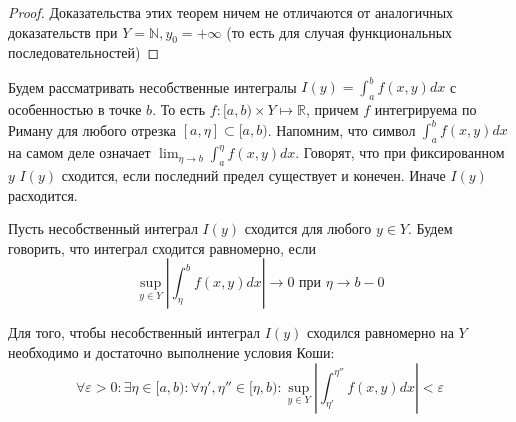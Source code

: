 \documentclass[document.tex]{subfiles}
\begin{document}
\begin{proof}
    Доказательства этих теорем ничем не отличаются от аналогичных доказательств при $Y = \mathbb{N}, y_0 = +\infty$ (то
    есть для случая функциональных последовательностей)
\end{proof}

\begin{definition}
    Будем рассматривать несобственные интегралы $I(y) = \int_{a}^{b}f(x, y)dx$ с особенностью в точке $b$. То есть $f:
    [a, b) \times Y \mapsto \mathbb{R}$, причем $f$ интегрируема по Риману для любого отрезка $[a, \eta] \subset [a,
        b)$. Напомним, что символ $\int_{a}^{b}f(x, y)dx$ на самом деле означает $\lim_{\eta \rightarrow b}
        \int_{a}^{\eta}f(x, y)dx$. Говорят, что при фиксированном $y$ $I(y)$ сходится, если последний предел существует
        и конечен. Иначе $I(y)$ расходится.
\end{definition}

\begin{definition}
    Пусть несобственный интеграл $I(y)$ сходится для любого $y \in Y$. Будем говорить, что интеграл сходится равномерно,
    если
    \[
        \sup_{y \in Y} \left| \int_{\eta}^{b}f(x, y) dx \right| \rightarrow 0 \text{ при } \eta \rightarrow b - 0
    \]
\end{definition}

\begin{theorem}
    Для того, чтобы несобственный интеграл $I(y)$ сходился равномерно на $Y$ необходимо и достаточно выполнение условия
    Коши:
    \[
        \forall \varepsilon > 0: \exists \eta \in [a, b): \forall \eta', \eta'' \in [\eta, b): \sup_{y \in Y} \left|
        \int_{\eta'}^{\eta''}f(x, y)dx \right| < \varepsilon
    \]
\end{theorem}
\end{document}

